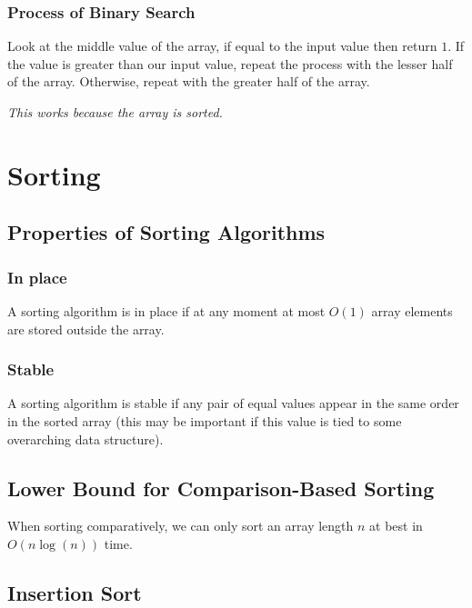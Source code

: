 \documentclass[a4paper, 12pt, twoside]{article}
\begin{document}
\subsubsection{Process of Binary Search}

Look at the middle value of the array, if equal to the input value
then return $1$. If the value is greater than our input value, repeat
the process with the lesser half of the array. Otherwise, repeat with
the greater half of the array.

\vspace{\baselineskip}

\textit{This works because the array is sorted.}

\section{Sorting}

\subsection{Properties of Sorting Algorithms}

\subsubsection{In place}

A sorting algorithm is in place if at any moment at most $O(1)$
array elements are stored outside the array.

\subsubsection{Stable}

A sorting algorithm is stable if any pair of equal values appear
in the same order in the sorted array (this may be important
if this value is tied to some overarching data structure).

\subsection{Lower Bound for Comparison-Based Sorting}

When sorting comparatively, we can only sort an array length
$n$ at best in $O(n\log(n))$ time.

\subsection{Insertion Sort}
\end{document}
